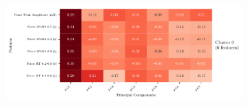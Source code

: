 \documentclass{report}
\begin{document}
        \begin{figure}[H]
                \centering
                \begin{subfigure}[b]{1\textwidth}
                    \includegraphics[height=0.3\textheight, keepaspectratio]{plots/chapter_6/pfa_dbscan_cluster_report_nifedipine.pdf}
                    \caption[Feature Clusters Derived from DBSCAN on Nifedipine Principal Component Loadings]{}
                    \label{fig:nifedipine_feature_cluster}
                \end{subfigure}
                

\end{figure}
\end{document}
